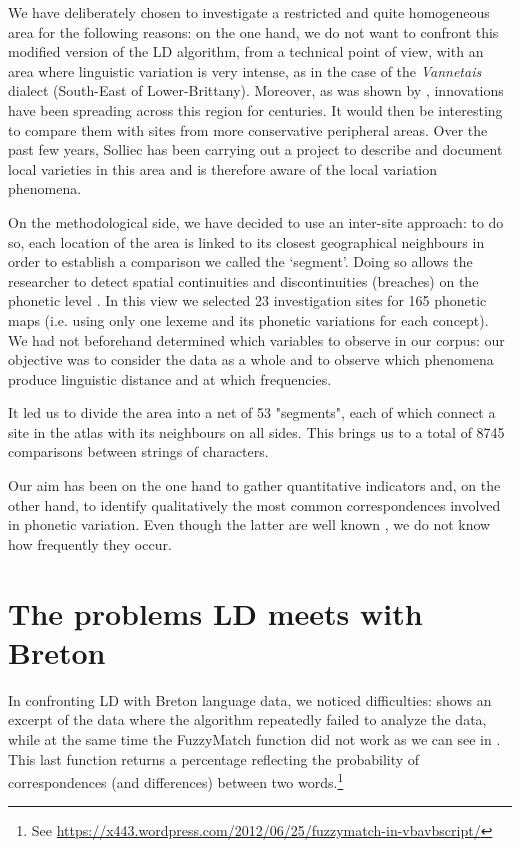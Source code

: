\documentclass[output=paper]{LSP/langsci}
\begin{document}
We have deliberately chosen to investigate a restricted and quite homogeneous area for the following reasons: on the one hand, we do not want to confront this modified version of the LD algorithm, from a technical point of view, with an area where linguistic variation is very intense, as in the case of the \textit{Vannetais} dialect (South-East of Lower-Brittany). Moreover, as was shown by \citet{falchun_perspectives_1981}, innovations have been spreading across this region for centuries. It would then be interesting to compare them with sites from more conservative peripheral areas. Over the past few years, Solliec has been carrying out a project to describe and document local varieties in this area and is therefore aware of the local variation phenomena.

On the methodological side, we have decided to use an inter-site approach: to do so, each location of the area is linked to its closest geographical neighbours in order to establish a comparison we called the ‘segment’. Doing so allows the researcher to detect spatial continuities and discontinuities (breaches) on the phonetic level \citep[137]{goebl_introduction_2012}. In this view we selected 23 investigation sites for 165 phonetic maps (i.e. using only one lexeme and its phonetic variations for each concept). We had not beforehand determined which variables to observe in our corpus: our objective was to consider the data as a whole and to observe which phenomena produce linguistic distance and at which frequencies.

It led us to divide the area into a net of 53 "segments", each of which connect a site in the atlas with its neighbours on all sides. This brings us to a total of 8745 comparisons between strings of characters.

Our aim has been on the one hand to gather quantitative indicators and, on the other hand, to identify qualitatively the most common correspondences involved in phonetic variation. Even though the latter are well known \citep{falchun_perspectives_1981,jackson_historical_1967}, we do not know how frequently they occur.

\section{The problems LD meets with Breton}

In confronting LD with Breton language data, we noticed difficulties:  shows an excerpt of the data where the algorithm repeatedly failed to analyze the data, while at the same time the FuzzyMatch function did not work as we can see in . This last function returns a percentage reflecting the probability of correspondences (and differences) between two words.\footnote{See  \url{https://x443.wordpress.com/2012/06/25/fuzzymatch-in-vbavbscript/}}
\end{document}
